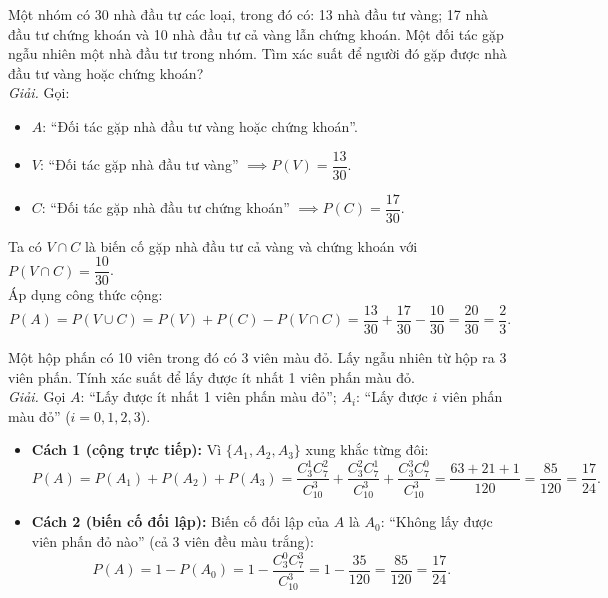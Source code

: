 \begin{vidu}
Một nhóm có 30 nhà đầu tư các loại, trong đó có: 13 nhà đầu tư vàng; 17 nhà đầu tư chứng khoán và 10 nhà đầu tư cả vàng lẫn chứng khoán. Một đối tác gặp ngẫu nhiên một nhà đầu tư trong nhóm. Tìm xác suất để người đó gặp được nhà đầu tư vàng hoặc chứng khoán?\\
\textit{Giải.} Gọi:
\begin{itemize}
    \item $A$: ``Đối tác gặp nhà đầu tư vàng hoặc chứng khoán''.
    \item $V$: ``Đối tác gặp nhà đầu tư vàng'' $\implies P(V) = \dfrac{13}{30}$.
    \item $C$: ``Đối tác gặp nhà đầu tư chứng khoán'' $\implies P(C) = \dfrac{17}{30}$.
\end{itemize}
Ta có $V \cap C$ là biến cố gặp nhà đầu tư cả vàng và chứng khoán với $P(V \cap C) = \dfrac{10}{30}$.\\
Áp dụng công thức cộng:
\[
P(A) = P(V \cup C) = P(V) + P(C) - P(V \cap C) = \frac{13}{30} + \frac{17}{30} - \frac{10}{30} = \frac{20}{30} = \frac{2}{3}.
\]
\end{vidu}

\begin{vidu}
Một hộp phấn có 10 viên trong đó có 3 viên màu đỏ. Lấy ngẫu nhiên từ hộp ra 3 viên phấn. Tính xác suất để lấy được ít nhất 1 viên phấn màu đỏ.\\
\textit{Giải.} Gọi $A$: ``Lấy được ít nhất 1 viên phấn màu đỏ''; $A_i$: ``Lấy được $i$ viên phấn màu đỏ'' ($i = 0, 1, 2, 3$).
\begin{itemize}
    \item \textbf{Cách 1 (cộng trực tiếp):} Vì $\{A_1, A_2, A_3\}$ xung khắc từng đôi:
    \[
    P(A) = P(A_1) + P(A_2) + P(A_3) = \frac{C_3^1 C_7^2}{C_{10}^3} + \frac{C_3^2 C_7^1}{C_{10}^3} + \frac{C_3^3 C_7^0}{C_{10}^3} = \frac{63 + 21 + 1}{120} = \frac{85}{120} = \frac{17}{24}.
    \]
    \item \textbf{Cách 2 (biến cố đối lập):} Biến cố đối lập của $A$ là $A_0$: ``Không lấy được viên phấn đỏ nào'' (cả 3 viên đều màu trắng):
    \[
    P(A) = 1 - P(A_0) = 1 - \frac{C_3^0 C_7^3}{C_{10}^3} = 1 - \frac{35}{120} = \frac{85}{120} = \frac{17}{24}.
    \]
\end{itemize}
\end{vidu}

